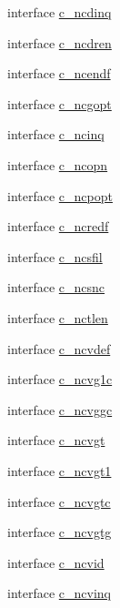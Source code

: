 \begin{DoxyCompactItemize}
interface \hyperlink{interfacenetcdf__fortv2__c__interfaces_1_1c__ncdinq}{c\+\_\+ncdinq}
\item 
interface \hyperlink{interfacenetcdf__fortv2__c__interfaces_1_1c__ncdren}{c\+\_\+ncdren}
\item 
interface \hyperlink{interfacenetcdf__fortv2__c__interfaces_1_1c__ncendf}{c\+\_\+ncendf}
\item 
interface \hyperlink{interfacenetcdf__fortv2__c__interfaces_1_1c__ncgopt}{c\+\_\+ncgopt}
\item 
interface \hyperlink{interfacenetcdf__fortv2__c__interfaces_1_1c__ncinq}{c\+\_\+ncinq}
\item 
interface \hyperlink{interfacenetcdf__fortv2__c__interfaces_1_1c__ncopn}{c\+\_\+ncopn}
\item 
interface \hyperlink{interfacenetcdf__fortv2__c__interfaces_1_1c__ncpopt}{c\+\_\+ncpopt}
\item 
interface \hyperlink{interfacenetcdf__fortv2__c__interfaces_1_1c__ncredf}{c\+\_\+ncredf}
\item 
interface \hyperlink{interfacenetcdf__fortv2__c__interfaces_1_1c__ncsfil}{c\+\_\+ncsfil}
\item 
interface \hyperlink{interfacenetcdf__fortv2__c__interfaces_1_1c__ncsnc}{c\+\_\+ncsnc}
\item 
interface \hyperlink{interfacenetcdf__fortv2__c__interfaces_1_1c__nctlen}{c\+\_\+nctlen}
\item 
interface \hyperlink{interfacenetcdf__fortv2__c__interfaces_1_1c__ncvdef}{c\+\_\+ncvdef}
\item 
interface \hyperlink{interfacenetcdf__fortv2__c__interfaces_1_1c__ncvg1c}{c\+\_\+ncvg1c}
\item 
interface \hyperlink{interfacenetcdf__fortv2__c__interfaces_1_1c__ncvggc}{c\+\_\+ncvggc}
\item 
interface \hyperlink{interfacenetcdf__fortv2__c__interfaces_1_1c__ncvgt}{c\+\_\+ncvgt}
\item 
interface \hyperlink{interfacenetcdf__fortv2__c__interfaces_1_1c__ncvgt1}{c\+\_\+ncvgt1}
\item 
interface \hyperlink{interfacenetcdf__fortv2__c__interfaces_1_1c__ncvgtc}{c\+\_\+ncvgtc}
\item 
interface \hyperlink{interfacenetcdf__fortv2__c__interfaces_1_1c__ncvgtg}{c\+\_\+ncvgtg}
\item 
interface \hyperlink{interfacenetcdf__fortv2__c__interfaces_1_1c__ncvid}{c\+\_\+ncvid}
\item 
interface \hyperlink{interfacenetcdf__fortv2__c__interfaces_1_1c__ncvinq}{c\+\_\+ncvinq}

\end{DoxyCompactItemize}
